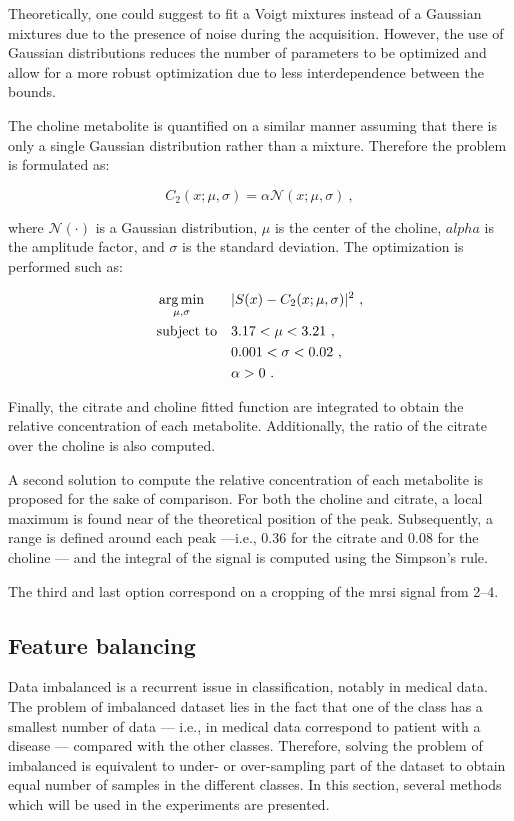 Theoretically, one could suggest to fit a Voigt mixtures instead of a Gaussian mixtures due to the presence of noise during the acquisition.
However, the use of Gaussian distributions reduces the number of parameters to be optimized and allow for a more robust optimization due to less interdependence between the bounds.

The choline metabolite is quantified on a similar manner assuming that there is only a single Gaussian distribution rather than a mixture.
Therefore the problem is formulated as:

\begin{equation}
  C_2(x; \mu, \sigma) = \alpha \mathcal{N}(x; \mu, \sigma) \ ,
  \label{eq:costcho}
\end{equation}

\noindent where $\mathcal{N}(\cdot)$ is a Gaussian distribution, $\mu$ is the center of the choline, $alpha$ is the amplitude factor, and $\sigma$ is the standard deviation. The optimization is performed such as:

\begin{equation}
\begin{aligned}
& \operatorname*{arg\,min}_{\mathbf{\mu, \sigma}} 
& & | S(x) - C_2(x; \mu, \sigma) |^{2} \ , \label{eq:mincostcho} \\
& \text{subject to}
& & 3.17 < \mu < 3.21 \ , \\
&&& 0.001 < \sigma < 0.02 \ , \\
&&& \alpha > 0 \ .
\end{aligned}
\end{equation}

Finally, the citrate and choline fitted function are integrated to obtain the relative concentration of each metabolite.
Additionally, the ratio of the citrate over the choline is also computed.

A second solution to compute the relative concentration of each metabolite is proposed for the sake of comparison.
For both the choline and citrate, a local maximum is found near of the theoretical position of the peak.
Subsequently, a range is defined around each peak ---i.e., \SI{0.36}{\ppm} for the citrate and \SI{0.08}{\ppm} for the choline --- and the integral of the signal is computed using the Simpson's rule.

The third and last option correspond on a cropping of the \ac{mrsi} signal from \SIrange{2}{4}{\ppm}.

\subsection{Feature balancing}\label{subsec:chp6:method:fea-bal}
Data imbalanced is a recurrent issue in classification, notably in medical data.
The problem of imbalanced dataset lies in the fact that one of the class has a smallest number of data --- i.e., in medical data correspond to patient with a disease --- compared with the other classes.
Therefore, solving the problem of imbalanced is equivalent to under- or over-sampling part of the dataset to obtain equal number of samples in the different classes.
In this section, several methods which will be used in the experiments are presented.

